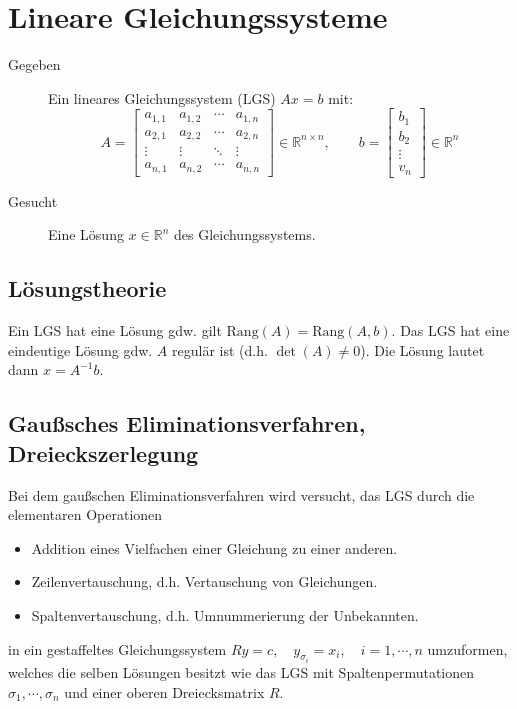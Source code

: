 \documentclass[a4paper, 11pt, accentcolor = tud3b]{tudreport}
\newcommand{\R}{\ensuremath{\mathbb{R}}}
\newcommand{\Rang}{\ensuremath{\textrm{Rang}}}
\begin{document}
	\chapter{Lineare Gleichungssysteme}
	    \begin{description}
	    	\item[Gegeben] Ein lineares Gleichungssystem (LGS) \( Ax = b \) mit:
		    	\begin{equation*}
			    	A =
			    	\begin{bmatrix}
				    	a_{1,1} & a_{1,2} & \cdots & a_{1,n} \\
				    	a_{2,1} & a_{2,2} & \cdots & a_{2,n} \\
				    	\vdots  & \vdots  & \ddots & \vdots \\
				    	a_{n,1} & a_{n,2} & \cdots & a_{n,n}
			    	\end{bmatrix}
			    	\in \R^{n \times n}, \qquad
			    	b =
			    	\begin{bmatrix}
				    	b_1 \\
				    	b_2 \\
				    	\vdots \\
				    	v_n
			    	\end{bmatrix}
			    	\in \R^n
		    	\end{equation*}
		    \item[Gesucht] Eine Lösung \( x \in \R^n \) des Gleichungssystems.
	    \end{description}
	
	    \section{Lösungstheorie}
		    Ein LGS hat eine Lösung gdw. gilt \( \Rang(A) = \Rang(A, b) \). Das LGS hat eine eindeutige Lösung gdw. \(A\) regulär ist (d.h. \( \det(A) \neq 0 \)). Die Lösung lautet dann \( x = A^{-1} b \).
	
	    \section{Gaußsches Eliminationsverfahren, Dreieckszerlegung}
	        Bei dem gaußschen Eliminationsverfahren wird versucht, das LGS durch die elementaren Operationen
	        \begin{itemize}
	        	\item Addition eines Vielfachen einer Gleichung zu einer anderen.
	        	\item Zeilenvertauschung, d.h. Vertauschung von Gleichungen.
	        	\item Spaltenvertauschung, d.h. Umnummerierung der Unbekannten.
	        \end{itemize}
	        in ein gestaffeltes Gleichungssystem \( Ry = c, \quad y_{\sigma_i} = x_i, \quad i = 1, \cdots, n \) umzuformen, welches die selben Lösungen besitzt wie das LGS mit Spaltenpermutationen \( \sigma_1, \cdots, \sigma_n \) und einer oberen Dreiecksmatrix \(R\).
	
\end{document}
